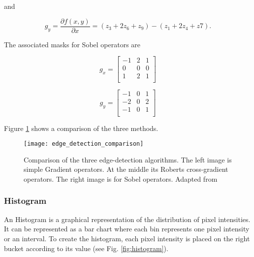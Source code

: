 and

\begin{equation}
    \label{eq:roberts_operators_y}
    g_y = \frac{\partial f(x,y)}{\partial x} = (z_3 + 2z_6 + z_9) - (z_1 + 2z_4 + z7).
\end{equation}

The associated masks for Sobel operators are

\begin{equation}
    g_x = \begin{bmatrix}
        -1 & 2 & 1 \\
        0 & 0 & 0 \\
        1 & 2 & 1 \\
    \end{bmatrix}
\end{equation}

\begin{equation}
    g_y = \begin{bmatrix}
        -1 & 0 & 1 \\
        -2 & 0 & 2 \\
        -1 & 0 & 1 \\
    \end{bmatrix}
\end{equation}

Figure \ref{fig:edge_detection_comparison} shows a comparison of the three methods.

\begin{figure}[htbp]
	\centering
	\texttt{[image: edge\_detection\_comparison]}
	\caption[Comparison of the three edge-detection algorithms.]{Comparison of the three edge-detection algorithms. The left image is simple Gradient operators. At the middle its Roberts cross-gradient operators. The right image is for Sobel operators. Adapted from \cite{Fonseca2017_acondicionamento_imagem}}
	\label{fig:edge_detection_comparison}
\end{figure}


\subsubsection*{Histogram}
\label{subsubsec:image_segmentation_histogram}

An Histogram is a graphical representation of the distribution of pixel intensities. It can be represented as a bar chart where each bin represents one pixel intensity or an interval. To create the histogram, each pixel intensity is placed on the right bucket according to its value (see Fig. \ref{fig:histogram}).

